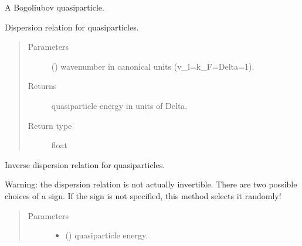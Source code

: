 \documentclass[letterpaper,10pt,english]{sphinxmanual}
\begin{document}

\begin{fulllineitems}
\label{\detokenize{code_structure:scdc.particle.Quasiparticle}}
A Bogoliubov quasiparticle.

\begin{fulllineitems}
\label{\detokenize{code_structure:scdc.particle.Quasiparticle.dispersion}}
Dispersion relation for quasiparticles.
\begin{quote}\begin{description}
\item[{Parameters}] \leavevmode
{} () \textendash{} wavenumber in canonical units (v\_l=k\_F=Delta=1).

\item[{Returns}] \leavevmode
quasiparticle energy in units of Delta.

\item[{Return type}] \leavevmode
float

\end{description}\end{quote}

\end{fulllineitems}


\begin{fulllineitems}
\label{\detokenize{code_structure:scdc.particle.Quasiparticle.dispersion_inverse}}
Inverse dispersion relation for quasiparticles.

Warning: the dispersion relation is not actually invertible. There are
two possible choices of a sign. If the sign  is not specified, this
method selects it randomly!
\begin{quote}\begin{description}
\item[{Parameters}] \leavevmode\begin{itemize}
\item {} 
 () \textendash{} quasiparticle energy.


\end{itemize}
\end{description}
\end{quote}
\end{fulllineitems}
\end{fulllineitems}
\end{document}
